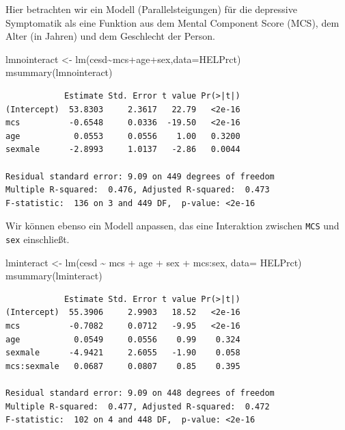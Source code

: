 \documentclass[
  ngerman,
]{scrbook}
\newenvironment{Shaded}{\begin{snugshade}}{\end{snugshade}}
\newcommand{\AttributeTok}[1]{\textcolor[rgb]{0.77,0.63,0.00}{#1}}
\newcommand{\FunctionTok}[1]{\textcolor[rgb]{0.00,0.00,0.00}{#1}}
\newcommand{\NormalTok}[1]{#1}
\newcommand{\OtherTok}[1]{\textcolor[rgb]{0.56,0.35,0.01}{#1}}
\newcommand{\SpecialCharTok}[1]{\textcolor[rgb]{0.00,0.00,0.00}{#1}}
\begin{document}
Hier betrachten wir ein Modell (Parallelsteigungen) für die depressive Symptomatik als eine Funktion aus dem Mental Component Score (MCS), dem Alter (in Jahren) und dem Geschlecht der Person.

\begin{Shaded}
\begin{Highlighting}[]
\NormalTok{lmnointeract }\OtherTok{\textless{}{-}} \FunctionTok{lm}\NormalTok{(cesd}\SpecialCharTok{\textasciitilde{}}\NormalTok{mcs}\SpecialCharTok{+}\NormalTok{age}\SpecialCharTok{+}\NormalTok{sex,}\AttributeTok{data=}\NormalTok{HELPrct)}
\FunctionTok{msummary}\NormalTok{(lmnointeract)}
\end{Highlighting}
\end{Shaded}

\begin{verbatim}
            Estimate Std. Error t value Pr(>|t|)
(Intercept)  53.8303     2.3617   22.79   <2e-16
mcs          -0.6548     0.0336  -19.50   <2e-16
age           0.0553     0.0556    1.00   0.3200
sexmale      -2.8993     1.0137   -2.86   0.0044

Residual standard error: 9.09 on 449 degrees of freedom
Multiple R-squared:  0.476, Adjusted R-squared:  0.473 
F-statistic:  136 on 3 and 449 DF,  p-value: <2e-16
\end{verbatim}

Wir können ebenso ein Modell anpassen, das eine Interaktion zwischen \texttt{MCS} und \texttt{sex} einschließt.

\begin{Shaded}
\begin{Highlighting}[]
\NormalTok{lminteract }\OtherTok{\textless{}{-}} \FunctionTok{lm}\NormalTok{(cesd }\SpecialCharTok{\textasciitilde{}}\NormalTok{ mcs }\SpecialCharTok{+}\NormalTok{ age }\SpecialCharTok{+}\NormalTok{ sex }\SpecialCharTok{+}\NormalTok{ mcs}\SpecialCharTok{:}\NormalTok{sex, }\AttributeTok{data=}\NormalTok{ HELPrct)}
\FunctionTok{msummary}\NormalTok{(lminteract)}
\end{Highlighting}
\end{Shaded}

\begin{verbatim}
            Estimate Std. Error t value Pr(>|t|)
(Intercept)  55.3906     2.9903   18.52   <2e-16
mcs          -0.7082     0.0712   -9.95   <2e-16
age           0.0549     0.0556    0.99    0.324
sexmale      -4.9421     2.6055   -1.90    0.058
mcs:sexmale   0.0687     0.0807    0.85    0.395

Residual standard error: 9.09 on 448 degrees of freedom
Multiple R-squared:  0.477, Adjusted R-squared:  0.472 
F-statistic:  102 on 4 and 448 DF,  p-value: <2e-16
\end{verbatim}
\end{document}

